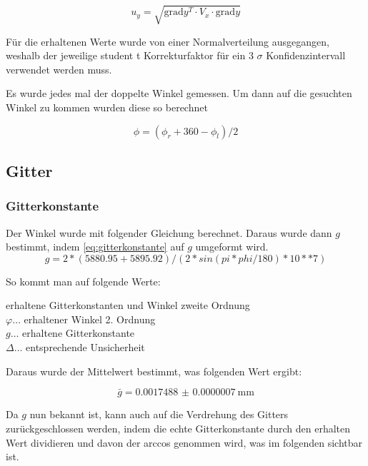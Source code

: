 \documentclass[11pt,ngerman]{scrartcl}
\begin{document}
\begin{equation}
	\label{eq:graduncentainty}
	u_y = \sqrt{\mathrm{grad} y^T \cdot V_x \cdot \mathrm{grad} y}
\end{equation}

Für die erhaltenen Werte wurde von einer Normalverteilung ausgegangen, weshalb
der jeweilige student t Korrekturfaktor für ein 3 $\sigma$ Konfidenzintervall
verwendet werden muss.

Es wurde jedes mal der doppelte Winkel gemessen. Um dann auf die gesuchten Winkel zu kommen wurden diese so berechnet

\begin{equation}
	\phi = (\phi_r + 360 - \phi_l) / 2
	\label{eq:messwertzuwinkel}
\end{equation}
\subsection{Gitter}

\subsubsection{Gitterkonstante}

Der Winkel wurde mit folgender Gleichung berechnet. Daraus wurde dann $g$ bestimmt, indem \autoref{eq:gitterkonstante} auf $g$ umgeformt wird.
\begin{equation}
	g = 2* (5880.95 + 5895.92) / (2 * sin(pi * phi / 180) * 10 ** 7)
\end{equation}

So kommt man auf folgende Werte:

\begin{table}[H]
	\caption{erhaltene Gitterkonstanten und Winkel zweite Ordnung \\ $\varphi \dots$ erhaltener Winkel 2. Ordnung \\ $g \dots$ erhaltene Gitterkonstante \\ $\Delta \dots $ entsprechende Unsicherheit}
	\centering
	\label{tab:wertgitter}
	
\end{table}

Daraus wurde der Mittelwert bestimmt, was folgenden Wert ergibt:

\begin{equation}
	\bar{g} = \SI{0.0017488(7)}{\mm}
	\label{eq:gbar}
\end{equation}

Da $g$ nun bekannt ist, kann auch auf die Verdrehung des Gitters
zurückgeschlossen werden, indem die echte Gitterkonstante durch den erhalten Wert
dividieren und davon der arccos genommen wird, was im folgenden sichtbar ist.
\end{document}
